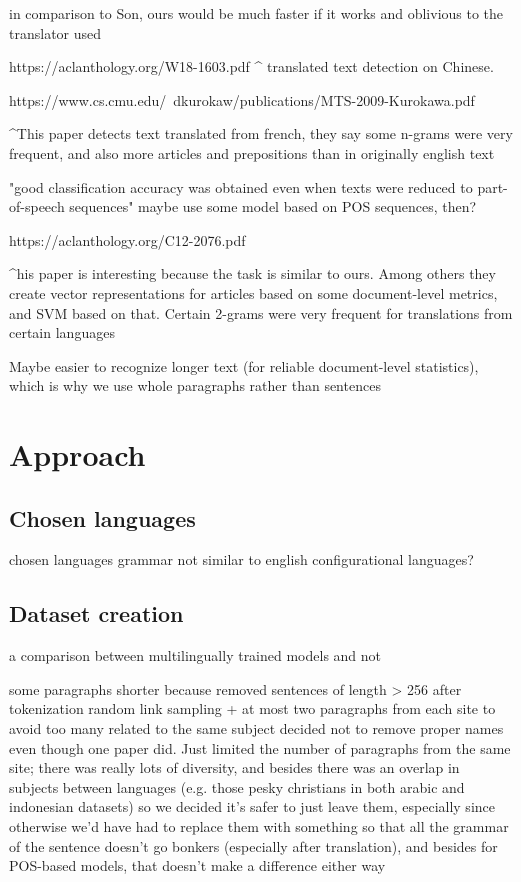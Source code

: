 \documentclass[twocolumn]{article}
\begin{document}
in comparison to Son, ours would be much faster if it works
and oblivious to the translator used

https://aclanthology.org/W18-1603.pdf
^ translated text detection on Chinese. 


https://www.cs.cmu.edu/~dkurokaw/publications/MTS-2009-Kurokawa.pdf

^This paper detects text translated from french, they say some n-grams were very frequent, and also more articles and prepositions than in originally english text

"good classification accuracy was obtained even when texts were reduced to part-of-speech sequences"  maybe use some model based on POS sequences, then?


https://aclanthology.org/C12-2076.pdf

^his paper is interesting because the task is similar to ours. Among others they create vector representations for articles based on some document-level metrics, and SVM based on that. Certain 2-grams were very frequent for translations from certain languages

Maybe easier to recognize longer text (for reliable document-level statistics), which is why we use whole paragraphs rather than sentences




\section*{Approach}

\subsection*{Chosen languages}

chosen languages
grammar not similar to english
configurational languages?

\subsection*{Dataset creation}

a comparison between multilingually trained models and not

some paragraphs shorter because removed sentences of length > 256 after tokenization
random link sampling + at most two paragraphs from each site to avoid too many related to the same subject
decided not to remove proper names even though one paper did. Just limited the number of paragraphs from the same site; there was really lots of diversity, and besides there was an overlap in subjects between languages (e.g. those pesky christians in both arabic and indonesian datasets) so we decided it's safer to just leave them, especially since otherwise we'd have had to replace them with something so that all the grammar of the sentence doesn't go bonkers (especially after translation), and besides for POS-based models, that doesn't make a difference either way
\end{document}
